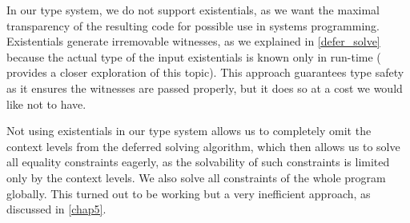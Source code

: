 In our type system, we do not support existentials, as we want the maximal transparency of the resulting code for possible use in systems programming. Existentials generate irremovable witnesses, as we explained in \cref{defer_solve} because the actual type of the input existentials is known only in run-time (\citet{grossman2002existential} provides a closer exploration of this topic). This approach guarantees type safety as it ensures the witnesses are passed properly, but it does so at a cost we would like not to have.

Not using existentials in our type system allows us to completely omit the context levels from the deferred solving algorithm, which then allows us to solve all equality constraints eagerly, as the solvability of such constraints is limited only by the context levels. We also solve all constraints of the whole program globally. This turned out to be working but a very inefficient approach, as discussed in \cref{chap5}.
